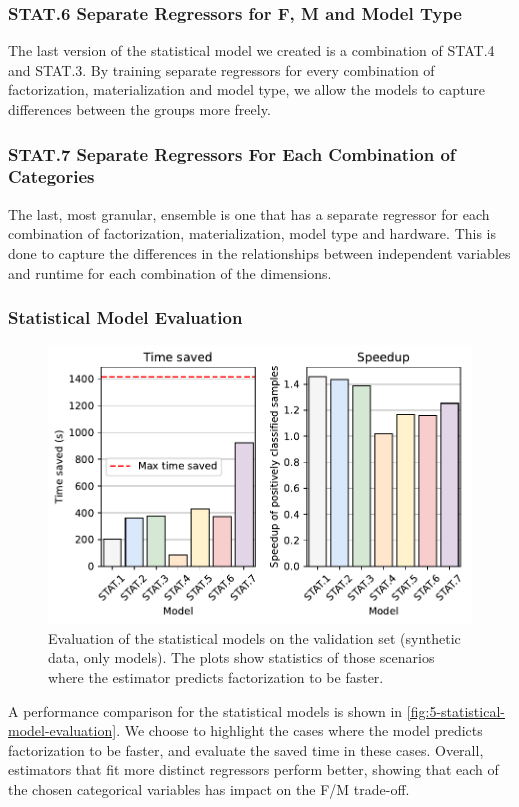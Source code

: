 \subsubsection*{STAT.6 Separate Regressors for F, M and Model Type}
The last version of the statistical model we created is a combination of STAT.4 and STAT.3. By training separate regressors for every combination of factorization, materialization and model type, we allow the models to capture differences between the groups more freely.

\subsubsection*{STAT.7 Separate Regressors For Each Combination of Categories}
The last, most granular, ensemble is one that has a separate regressor for each combination of factorization, materialization, model type and hardware. This is done to capture the differences in the relationships between independent variables and runtime for each combination of the dimensions.


\subsubsection{Statistical Model Evaluation}
\begin{figure}[ht]
    \centering
    \includegraphics[width=0.75\linewidth]{chapters/05_cost_estimation/figures/stat-models-compare.pdf}
    \caption[Statistical Model Evaluation]{Evaluation of the statistical models on the validation set (synthetic data, only models). The plots show statistics of those scenarios where the estimator predicts factorization to be faster. }
    \label{fig:5-statistical-model-evaluation}
\end{figure}

A performance comparison for the statistical models is shown in \autoref{fig:5-statistical-model-evaluation}. We choose to highlight the cases where the model predicts factorization to be faster, and evaluate the saved time in these cases. Overall, estimators that fit more distinct regressors perform better, showing that each of the chosen categorical variables has impact on the F/M trade-off.

